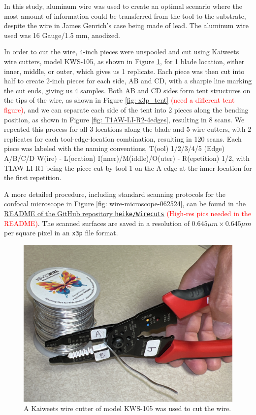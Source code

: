\documentclass[fleqn,10pt]{wlscirep}
\begin{document}
In this study, aluminum wire was used to create an optimal scenario
where the most amount of information could be transferred from the tool
to the substrate, despite the wire in James Genrich's case being made of
lead. The aluminum wire used was 16 Gauge/1.5 mm, anodized.

In order to cut the wire, 4-inch pieces were unspooled and cut using
Kaiweets wire cutters, model KWS-105, as shown in Figure
\ref{fig: kaiweet-label-062524}, for 1 blade location, either inner,
middle, or outer, which gives us 1 replicate. Each piece was then cut
into half to create 2-inch pieces for each side, AB and CD, with a
sharpie line marking the cut ends, giving us 4 samples. Both AB and CD
sides form tent structures on the tips of the wire, as shown in Figure
\ref{fig: x3p_tent} \textcolor{red}{(need a different tent figure)}, and
we can separate each side of the tent into 2 pieces along the bending
position, as shown in Figure \ref{fig: T1AW-LI-R2-4edges}, resulting in
8 scans. We repeated this process for all 3 locations along the blade
and 5 wire cutters, with 2 replicates for each tool-edge-location
combination, resulting in 120 scans. Each piece was labeled with the
naming conventions, T(ool) 1/2/3/4/5 (Edge) A/B/C/D W(ire) - L(ocation)
I(nner)/M(iddle)/O(uter) - R(epetition) 1/2, with T1AW-LI-R1 being the
piece cut by tool 1 on the A edge at the inner location for the first
repetition.

A more detailed procedure, including standard scanning protocols for the
confocal microscope in Figure \ref{fig: wire-microscope-062524}, can be
found in the
\href{https://github.com/heike/Wirecuts/blob/main/README.md}{README of the GitHub repository \texttt{heike/Wirecuts}}
\textcolor{red}{(High-res pics needed in the README)}. The scanned
surfaces are saved in a resolution of \(0.645 \mu m \times 0.645 \mu m\)
per square pixel in an \texttt{x3p} file format.

\begin{figure}[ht]
\centering
\includegraphics[width=0.5\linewidth]{kaiweet-label-062524.jpg}
\caption{A Kaiweets wire cutter of model KWS-105 was used to cut the wire.}
\label{fig: kaiweet-label-062524}
\end{figure}
\end{document}
